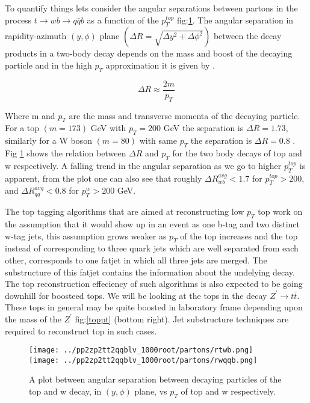 \documentclass[12pt,a4paper]{article}		%
\begin{document}
To quantify things lets consider the angular separations between partons in the process $ t \to w b \to q \bar{q} b$ as a function of the $p_T^{top}$ fig:\ref{rwbt}. The angular separation in rapidity-azimuth $(y, \phi)$ plane $\left(  \Delta R = \sqrt{\Delta y^2 + \Delta \phi^2} \right)$ between the decay products in a two-body decay depends on the mass and boost of the decaying particle and in the high $p_T$ approximation it is given by .

\begin{equation}
 \Delta R \approx \frac{2m}{p_T}
\end{equation} 

Where m and $p_T$ are the mass and transverse momenta of the decaying particle. For a top $(m = 173)$ GeV \cite{pdg-top} with $p_T = 200$ GeV the separation is $\Delta R = 1.73 $, similarly for a W boson $(m = 80)$ \cite{pdg-w} with same $p_T$ the separation is $\Delta R = 0.8$ . Fig \ref{rwbt} shows the relation between $\Delta R $ and $p_T$ for the two body decays of top and w respectively. A falling trend in the angular separation as we go to higher $p_T^{top}$  is apparent, from the plot one can also see that roughly $\Delta R_{wb}^{avg} < 1.7$ for $p_T^{top} > 200$, and $\Delta R_{qq}^{avg}< 0.8 $ for $p_T^{w} > 200$ GeV.   

The top tagging algorithms that are aimed at reconstructing low $p_T$ top work on the assumption that it would show up in an event as one b-tag and two distinct w-tag jets, this assumption grows weaker as $p_T$ of the top increases and the top instead of corresponding to three quark jets which are well separated from each other, corresponds to one fatjet in which all three jets are merged. The substructure of this fatjet contains the information about the undelying decay.  The top reconstruction effeciency of such algorithms is also expected to be going downhill for boosteed tops. We will be looking at the tops in the decay $Z^\prime \to t \bar{t}$. These tops in general may be quite boosted in laboratory frame depending upon the mass of the $Z^\prime$ fig:\ref{toppt} (bottom right). Jet substructure techniques are required to reconstruct top in such cases.  
   


\newpage
 	\begin{figure}[h]
 		\begin{centering}	
 			\texttt{[image: ../pp2zp2tt2qqblv\_1000root/partons/rtwb.png]} 
 			\texttt{[image: ../pp2zp2tt2qqblv\_1000root/partons/rwqqb.png]}
 			\caption{A plot between angular separation between decaying particles of the top and w decay, in $(y,\phi)$ plane,  vs $p_T$ of top and w respectively.}
 			\label{rwbt}
 			\centering
 		\end{centering} 		
 	\end{figure}   
 
\end{document}
